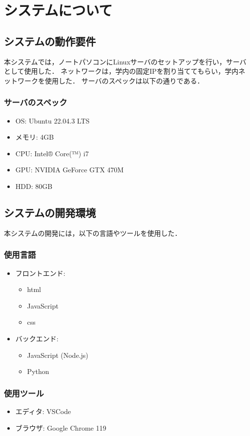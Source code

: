 \section{システムについて} 

\subsection{システムの動作要件} 本システムでは，ノートパソコンにLinuxサーバのセットアップを行い，サーバとして使用した． ネットワークは，学内の固定IPを割り当ててもらい，学内ネットワークを使用した． 
サーバのスペックは以下の通りである．
\subsubsection{サーバのスペック} 
\begin{itemize} 
\item OS: Ubuntu 22.04.3 LTS 
\item メモリ: 4GB 
\item CPU: Intel® Core(™) i7 
\item GPU: NVIDIA GeForce GTX 470M \item HDD: 80GB 
\end{itemize}
\subsection{システムの開発環境} 本システムの開発には，以下の言語やツールを使用した．
\subsubsection{使用言語} 
\begin{itemize} 
\item フロントエンド: 
\begin{itemize} 
\item html 
\item JavaScript 
\item css 
\end{itemize} 
\item バックエンド: 
\begin{itemize} 
\item JavaScript (Node.js) 
\item Python 
\end{itemize} 
\end{itemize}
\subsubsection{使用ツール} 
\begin{itemize} 
\item エディタ: VSCode 
\item ブラウザ: Google Chrome 119 
\end{itemize}
